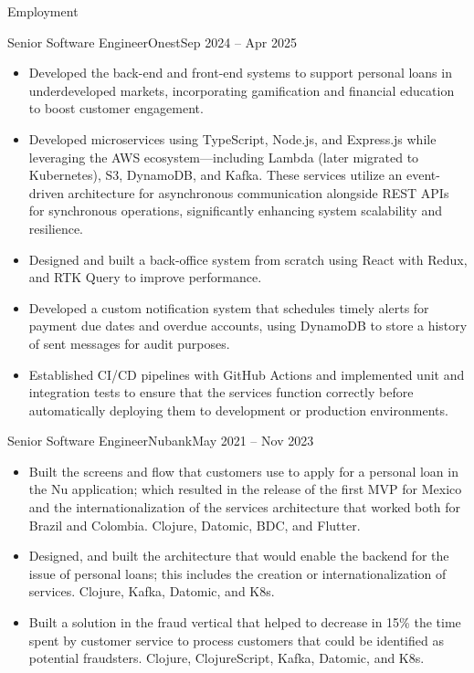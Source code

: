 \documentclass[calibri]{../mcdowell-cv/mcdowellcv}
\begin{document}
\begin{cvsection}{Employment}
		\begin{cvsubsection}{Senior Software Engineer}{Onest}{Sep 2024 -- Apr 2025}
			\begin{itemize}
				\item Developed the back-end and front-end systems to support personal loans in underdeveloped markets, incorporating gamification and financial education to boost customer engagement.
				\item Developed microservices using TypeScript, Node.js, and Express.js while leveraging the AWS ecosystem—including Lambda (later migrated to Kubernetes), S3, DynamoDB, and Kafka. These services utilize an event-driven architecture for asynchronous communication alongside REST APIs for synchronous operations, significantly enhancing system scalability and resilience.
				\item Designed and built a back-office system from scratch using React with Redux, and RTK Query to improve performance.
				\item Developed a custom notification system that schedules timely alerts for payment due dates and overdue accounts, using DynamoDB to store a history of sent messages for audit purposes.
				\item Established CI/CD pipelines with GitHub Actions and implemented unit and integration tests to ensure that the services function correctly before automatically deploying them to development or production environments.
			\end{itemize}
		\end{cvsubsection}

		\begin{cvsubsection}{Senior Software Engineer}{Nubank}{May 2021 -- Nov 2023}
			\begin{itemize}
				\item Built the screens and flow that customers use to apply for a personal loan in the Nu application; which resulted in the release of the first MVP for Mexico and the internationalization of the services architecture that worked both for Brazil and Colombia. Clojure, Datomic, BDC, and Flutter.
				\item Designed, and built the architecture that would enable the backend for the issue of personal loans; this includes the creation or internationalization of services. Clojure, Kafka, Datomic, and K8s.
				\item Built a solution in the fraud vertical that helped to decrease in 15\% the time spent by customer service to process customers that could be identified as potential fraudsters. Clojure, ClojureScript, Kafka, Datomic, and K8s.
			\end{itemize}
		\end{cvsubsection}


\end{cvsection}
\end{document}
